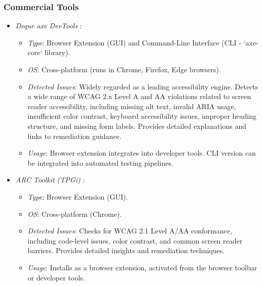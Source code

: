 \subsubsection{Commercial Tools}
\label{subsubsec:web-commercial-tools}
\begin{itemize}
    \item \emph{Deque axe DevTools} \cite{axeDevTools}:
        \begin{itemize}
            \item \emph{Type}: Browser Extension (GUI) and Command-Line Interface (CLI - `axe-core` library).
            \item \emph{OS}: Cross-platform (runs in Chrome, Firefox, Edge browsers).
            \item \emph{Detected Issues}: Widely regarded as a leading accessibility engine. Detects a wide range of WCAG 2.x Level A and AA violations related to screen reader accessibility, including missing alt text, invalid ARIA usage, insufficient color contrast, keyboard accessibility issues, improper heading structure, and missing form labels. Provides detailed explanations and links to remediation guidance.
            \item \emph{Usage}: Browser extension integrates into developer tools. CLI version can be integrated into automated testing pipelines.
        \end{itemize}
    \item \emph{ARC Toolkit (TPGi)} \cite{arctoolkit}:
        \begin{itemize}
            \item \emph{Type}: Browser Extension (GUI).
            \item \emph{OS}: Cross-platform (Chrome).
            \item \emph{Detected Issues}: Checks for WCAG 2.1 Level A/AA conformance, including code-level issues, color contrast, and common screen reader barriers. Provides detailed insights and remediation techniques.
            \item \emph{Usage}: Installs as a browser extension, activated from the browser toolbar or developer tools.
        \end{itemize}
\end{itemize}

